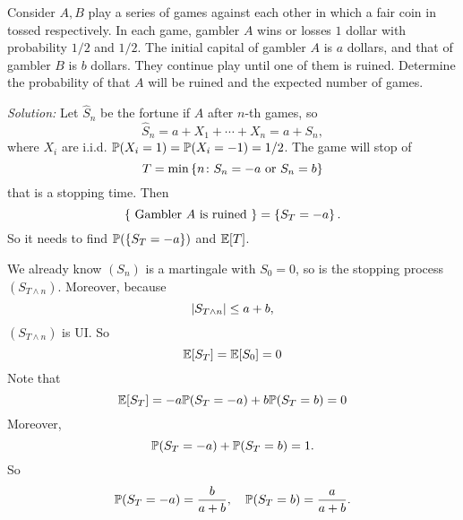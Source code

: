 \begin{exam}
    Consider $A,B$ play a series of games against each other in which a fair coin in tossed respectively. In each game, gambler $A$ wins or losses $1$ dollar with probability $1/2$ and $1/2$. The initial capital of gambler $A$ is $a$ dollars, and that of gambler $B$ is $b$ dollars. They continue play until one of them is ruined. Determine the probability of that $A$ will be ruined and the expected number of games.

    \noindent \emph{Solution:} Let $\hat{S}_n$ be the fortune if $A$ after $n$-th games, so
    \begin{equation*}
        \hat{S}_n = a + X_1 + \cdots + X_n = a + S_n,
    \end{equation*}
    where $X_i$ are i.i.d. $\mathbb{P}(X_i = 1) = \mathbb{P}(X_i = -1) = 1 / 2$. The game will stop of
    \begin{equation*}
        T = \min \left\{n \colon S_n = -a \text{ or } S_n = b\right\}
    \end{equation*}
    that is a stopping time. Then
    \begin{equation*}
        \left\{\text{ Gambler } A \text{ is ruined }\right\} = \left\{S_T = -a\right\}.
    \end{equation*}
    So it needs to find $\mathbb{P}(\left\{S_T = -a\right\})$ and $\mathbb{E}[T]$.

    We already know $(S_n)$ is a martingale with $S_0 = 0$, so is the stopping process $(S_{T \wedge n})$. Moreover, because
    \begin{equation*}
        \left\lvert S_{T \wedge n}\right\lvert \leq a + b,
    \end{equation*}
    $(S_{T \wedge n})$ is UI. So
    \begin{equation*}
        \mathbb{E}[S_T] = \mathbb{E}[S_0] = 0
    \end{equation*}
    Note that
    \begin{equation*}
        \mathbb{E}[S_T] = -a\mathbb{P}(S_T = -a) + b \mathbb{P}(S_T = b) = 0
    \end{equation*}
    Moreover,
    \begin{equation*}
        \mathbb{P}(S_T = -a) + \mathbb{P}(S_T = b) = 1.
    \end{equation*}
    So
    \begin{equation*}
        \mathbb{P}(S_T = -a) = \frac{b}{a+b},\quad \mathbb{P}(S_T = b) = \frac{a}{a+b}.
    \end{equation*}


\end{exam}
